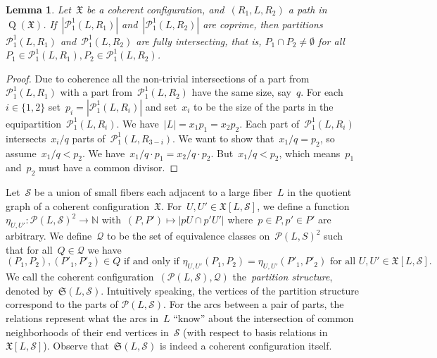 \documentclass[english,a4paper]{article}
\theoremstyle{plain}
\newtheorem{lemma}      [theorem]{Lemma}
\theoremstyle{definition}
\newcommand{\Nat}{\ensuremath{\mathbb{N}}}
\newcommand{\abs}[1]{| #1 |}
\newcommand{\coherentConfig}{\ensuremath{\mathfrak{X}}}
\newcommand{\interspace}[2]{\ensuremath{\coherentConfig[#1,#2]}}
\DeclareMathOperator*{\Quotient}{Q}
\newcommand{\quotientGraph}[1]{\ensuremath{\Quotient(#1)}}
\newcommand{\partition}[1]{\ensuremath{\mathcal{P}^1_1(#1)}}
\newcommand{\equivalenceClasses}[1]{\ensuremath{\mathcal{P}(#1)}}
\newcommand{\partitionStructure}[1]{\ensuremath{\mathfrak{S}(#1)}}
\begin{document}
\begin{lemma}
\label{global-argument:partition:fully-intersecting/lem}
    Let~$\coherentConfig$ be a coherent configuration, and~$(R_1, L, R_2)$ a path in~$\quotientGraph{\coherentConfig}$.
    If~$\abs{\partition{L,R_1}}$ and~$\abs{\partition{L,R_2}}$ are coprime, then partitions~$\partition{L,R_1}$ and~$\partition{L, R_2}$ are \emph{fully intersecting}, that is, $P_1 \cap P_2 \neq \emptyset$ for all~$P_1 \in \partition{L,R_1}, P_2 \in \partition{L,R_2}$.
\end{lemma}
\begin{proof}
    Due to coherence all the non-trivial intersections of a part from~$\partition{L,R_1}$ with a part from~$\partition{L,R_2}$ have the same size, say~$q$. For each~$i\in\{1,2\}$ set~$p_i= |\partition{L,R_i}|$
    and set~$x_i$ to be the size of the parts in the equipartition~$\partition{L,R_i}$.
    We have~$|L|= x_1p_1=x_2p_2$.
    Each part of~$\partition{L,R_i}$ intersects~$x_i/q$ parts of~$\partition{L,R_{3-i}}$. We want to show that~$x_1/q= p_2$, so assume~$x_1/q<p_2$. We have~$x_1/q\cdot p_1 = x_2/q\cdot p_2$.
    But~$x_1/q< p_2$, which means~$p_1$ and~$p_2$ must have a common divisor.
\end{proof}



Let~$\mathcal{S}$ be a union of small fibers each adjacent to a large fiber~$L$ in the quotient graph of a coherent configuration~$\coherentConfig$.
For~$U,U' \in \interspace{L}{\mathcal{S}}$, we define a function~$\eta_{U,U'} \colon \equivalenceClasses{L,\mathcal{S}}^2 \longrightarrow \Nat$ with~$(P,P') \mapsto | p U \cap p' U'|$ where~$p \in P,p' \in P'$ are arbitrary.
We define~$\mathcal{Q}$ to be the set of equivalence classes on~$\equivalenceClasses{L,S}^2$ such that for all~$Q \in \mathcal{Q}$ we have
\[
    (P_1,P_2),(P'_1,P'_2) \in Q \text{ if and only if } \eta_{U,U'}(P_1,P_2) = \eta_{U,U'}(P'_1,P'_2) \text{ for all } U,U' \in \interspace{L}{\mathcal{S}}.
\]
We call the coherent configuration~$(\equivalenceClasses{L,\mathcal{S}}, \mathcal{Q})$ the~\emph{partition structure}, denoted by~$\partitionStructure{L,\mathcal{S}}$.
Intuitively speaking, the vertices of the partition structure correspond to the parts of $\equivalenceClasses{L,\mathcal{S}}$. For the arcs between a pair of parts, the relations represent what the arcs in~$L$ ``know'' about the intersection of common neighborhoods of their end vertices in~$\mathcal{S}$ (with respect to basis relations in~$\interspace{L}{\mathcal{S}}$).
Observe that~$\partitionStructure{L,\mathcal{S}}$ is indeed a coherent configuration itself.
\end{document}
